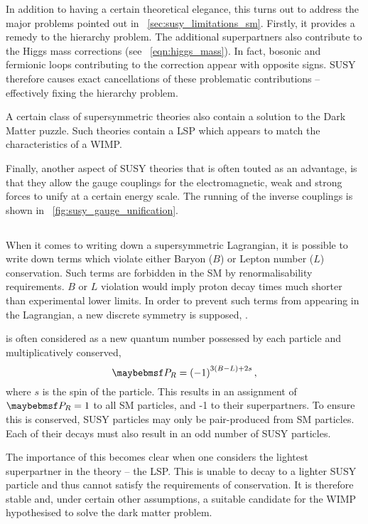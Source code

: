 In addition to having a certain theoretical elegance, this turns out to address
the major problems pointed out in \sec~\ref{sec:susy_limitations_sm}. Firstly,
it provides a remedy to the hierarchy problem. The additional superpartners also
contribute to the Higgs mass corrections (see \eqn~\ref{eqn:higgs_mass}). In
fact, bosonic and fermionic loops contributing to the correction appear with
opposite signs. \acl{SUSY} therefore causes exact cancellations of these
problematic contributions -- effectively fixing the hierarchy problem.

A certain class of supersymmetric theories also contain a solution to the Dark
Matter puzzle. Such theories contain a \acf{LSP} which appears to match the
characteristics of a \ac{WIMP}.

Finally, another aspect of \ac{SUSY} theories that is often touted as an
advantage, is that they allow the gauge couplings for the electromagnetic, weak
and strong forces to unify at a certain energy scale. The running of the inverse
couplings is shown in \fig~\ref{fig:susy_gauge_unification}.

\subsection[R-Parity]{\Rparity}
When it comes to writing down a supersymmetric Lagrangian, it is possible to
write down terms which violate either Baryon ($B$) or Lepton number ($L$)
conservation. Such terms are forbidden in the \ac{SM} by renormalisability
requirements. $B$ or $L$ violation would imply proton decay times much shorter
than experimental lower limits. In order to prevent such terms from appearing in
the Lagrangian, a new discrete symmetry is supposed, \Rparity.

\Rparity is often considered as a new quantum number possessed by each particle
and multiplicatively conserved,
\begin{equation*}
\PR = \left(-1\right)^{3(B-L)+2s},
\end{equation*}
where $s$ is the spin of the particle. This results in an assignment of $\PR =
1$ to all \ac{SM} particles, and -1 to their superpartners. To ensure this is
conserved, \ac{SUSY} particles may only be pair-produced from \ac{SM}
particles. Each of their decays must also result in an odd number of \ac{SUSY}
particles.

The importance of this becomes clear when one considers the lightest
superpartner in the theory -- the \ac{LSP}. This is unable to decay to a lighter
\ac{SUSY} particle and thus cannot satisfy the requirements of \Rparity
conservation. It is therefore stable and, under certain other assumptions, a
suitable candidate for the \ac{WIMP} hypothesised to solve the dark matter
problem.

